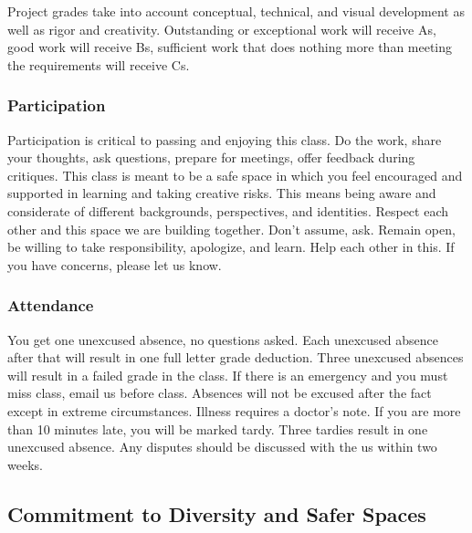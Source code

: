 \documentclass[10pt,letter,english]{article}
\begin{document}
Project grades take into account conceptual, technical, and visual development as well as rigor and creativity. Outstanding or exceptional work will receive As, good work will receive Bs, sufficient work that does nothing more than meeting the requirements will receive Cs.

\hypertarget{participation}{%
      \subsubsection{Participation}\label{participation}}

Participation is critical to passing and enjoying this class. Do the work, share your thoughts, ask questions, prepare for meetings, offer feedback during critiques. This class is meant to be a safe space in which you feel encouraged and supported in learning and taking creative risks. This means being aware and considerate of different backgrounds, perspectives, and identities. Respect each other and this space we are building together. Don't assume, ask. Remain open, be willing to take responsibility, apologize, and learn. Help each other in this. If you have concerns, please let us know.

\hypertarget{attendance}{%
      \subsubsection{Attendance}\label{attendance}}

You get one unexcused absence, no questions asked. Each unexcused absence after that will result in one full letter grade deduction. Three unexcused absences will result in a failed grade in the class. If there is an emergency and you must miss class, email us before class. Absences will not be excused after the fact except in extreme circumstances. Illness requires a doctor's note. If you are more than 10 minutes late, you will be marked tardy. Three tardies result in one unexcused absence. Any disputes should be discussed with the us within two weeks.


\hypertarget{commitment-to-diversity-and-safer-spaces}{%
      \subsection{Commitment to Diversity and Safer
            Spaces}\label{commitment-to-diversity-and-safer-spaces}}
\end{document}
